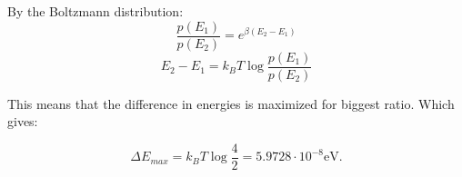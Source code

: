 \begin{solution}

By the Boltzmann distribution:
\[
\frac{p(E_1)}{p(E_2)} = e^{\beta(E_2 - E_1)}
\]
\[
E_2 - E_1 = k_B T \log{\frac{p(E_1)}{p(E_2)}}
\]

This means that the difference in energies is maximized for biggest ratio. Which gives:

\[
\Delta E_{max} = k_B T \log{\frac{4}{2}} = \boxed{5.9728 \cdot 10 ^ {-8}\mathrm{eV}.}
\]



\end{solution}